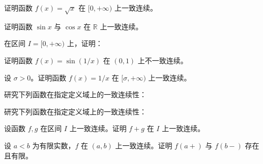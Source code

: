 \newpage
\noindent\begin{minipage}{\textwidth}
证明函数 $f(x)=\sqrt x$ 在 $[0,+\infty)$ 上一致连续。
\end{minipage}\par\vfill
\noindent\begin{minipage}{\textwidth}
证明函数 $\sin x$ 与 $\cos x$ 在 $\mathbb R$ 上一致连续。
\end{minipage}\par\vfill
\noindent\begin{minipage}{\textwidth}
在区间 $I=[0,+\infty)$ 上，证明：
\end{minipage}\par\vfill
\newpage
\noindent\begin{minipage}{\textwidth}
证明函数 $f(x)=\sin(1/x)$ 在 $(0,1)$ 上不一致连续。
\end{minipage}\par\vfill
\noindent\begin{minipage}{\textwidth}
设 $\sigma>0$。证明函数 $f(x)=1/x$ 在 $[\sigma,+\infty)$ 上一致连续。
\end{minipage}\par\vfill
\noindent\begin{minipage}{\textwidth}
研究下列函数在指定定义域上的一致连续性：
\end{minipage}\par\vfill
\newpage
\noindent\begin{minipage}{\textwidth}
研究下列函数在指定定义域上的一致连续性：
\end{minipage}\par\vfill
\noindent\begin{minipage}{\textwidth}
设函数 $f,g$ 在区间 $I$ 上一致连续。证明 $f+g$ 在 $I$ 上一致连续。
\end{minipage}\par\vfill
\noindent\begin{minipage}{\textwidth}
设 $a<b$ 为有限实数，$f$ 在 $(a,b)$ 上一致连续。证明 $f(a+)$ 与 $f(b-)$ 存在且有限。
\end{minipage}\par\vfill
